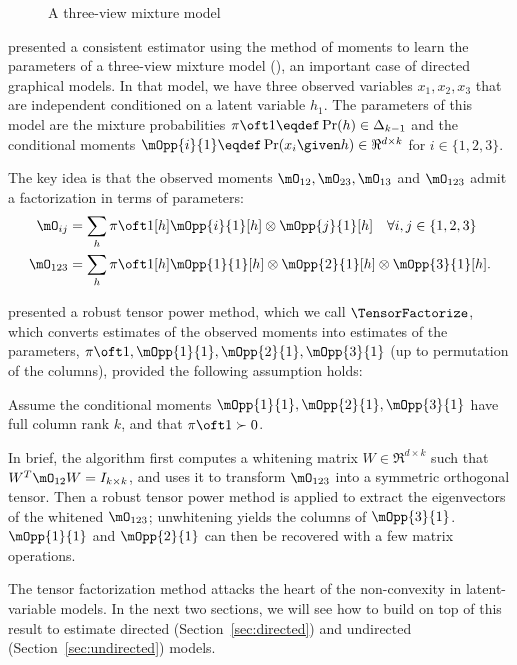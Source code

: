 \begin{figure}[t]
  \label{fig:three-view}
  \centering
  
  \caption{A three-view mixture model}
\end{figure}

\citet{anandkumar12moments} presented a consistent estimator
  using the method of moments to learn the parameters of a three-view
  mixture model (), an important case of directed
  graphical models. %
In that model, we have three observed variables $x_1, x_2, x_3$
  that are independent conditioned on a latent variable $h_1$.  
The parameters of this model are the mixture probabilities $\pi\oft 1 \eqdef
  \Pr(h) \in \Delta_{k-1}$ and the conditional moments $\mOpp{i}{1} \eqdef
  \Pr(x_i \given h) \in \Re^{d \times k}$ for $i \in \{1,2,3\}$.

  The key idea is that the observed moments $\mO_{12}, \mO_{23}, \mO_{13}$ and
  $\mO_{123}$ admit a factorization in terms of parameters:
\begin{align*}
  \mO_{ij} &= \sum_h {\pi \oft 1}[h] {\mOpp{i}{1}}[h] \otimes {\mOpp{j}{1}}[h] \quad \forall i,j \in \{1,2,3\} \\
  \mO_{123} &= \sum_h {\pi \oft 1}[h] {\mOpp{1}{1}}[h] \otimes {\mOpp{2}{1}}[h] \otimes  {\mOpp{3}{1}}[h].
\end{align*}

\citet{anandkumar13tensor} presented a robust tensor power method, which
  we call $\TensorFactorize$, which converts estimates of the observed moments 
  into estimates of the parameters, $\pi\oft 1, \mOpp{1}{1},
  \mOpp{2}{1},\mOpp{3}{1}$ (up to permutation of the columns), provided
  the following assumption holds:

\begin{assumption}
\label{asm:full-rank}
Assume the conditional moments $\mOpp{1}{1}, \mOpp{2}{1}, \mOpp{3}{1}$ have full column rank
  $k$, and that $\pi\oft 1 \succ 0$.
\end{assumption}

In brief, the algorithm first computes a whitening matrix $W \in
  \Re^{d \times k}$ such that $W^T \mO_{12} W = I_{k \times k}$,
  and uses it to transform $\mO_{123}$ into a symmetric orthogonal tensor.  
Then a robust tensor power method is applied to extract the eigenvectors
of the whitened $\mO_{123}$; unwhitening yields the columns of $\mOpp{3}{1}$.
  $\mOpp{1}{1}$ and $\mOpp{2}{1}$ can then be recovered with a few matrix operations.

The tensor factorization method attacks the heart of the non-convexity
  in latent-variable models.  In the next two sections,
  we will see how to build on top of this result to estimate directed (Section~\ref{sec:directed})
  and undirected (Section~\ref{sec:undirected}) models.
